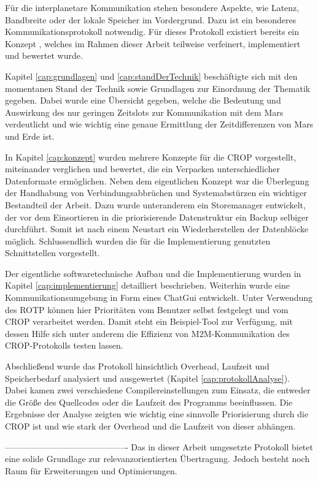 
Für die interplanetare Kommunikation stehen besondere Aspekte, wie Latenz,
Bandbreite oder der lokale Speicher im Vordergrund. Dazu ist ein besonderes
Kommunikationsprotokoll notwendig. Für dieses Protokoll existiert
bereits ein Konzept \cite{Daher}, welches im Rahmen dieser Arbeit
teilweise verfeinert, implementiert und bewertet wurde.

Kapitel \ref{cap:grundlagen} und \ref{cap:standDerTechnik} beschäftigte sich
mit den momentanen Stand der Technik sowie Grundlagen zur Einordnung der
Thematik gegeben. Dabei wurde eine Übersicht gegeben, welche die Bedeutung und
Auswirkung des nur geringen Zeitslots zur Kommunikation mit dem Mars
verdeutlicht und wie wichtig eine genaue Ermittlung der Zeitdifferenzen von Mars
und Erde ist.

In Kapitel \ref{cap:konzept} wurden mehrere Konzepte für die CROP vorgestellt,
miteinander verglichen und bewertet, die ein Verpacken unterschiedlicher
Datenformate ermöglichen. Neben dem eigentlichen Konzept war die Überlegung der
Handhabung von Verbindungsabbrüchen und Systemabstürzen ein wichtiger
Bestandteil der Arbeit. Dazu wurde unteranderem ein Storemanager entwickelt, der
vor dem Einsortieren in die priorisierende Datenstruktur ein Backup selbiger
durchführt. Somit ist nach einem Neustart ein Wiederherstellen der Datenblöcke
möglich. Schlussendlich wurden die für die Implementierung genutzten
Schnittstellen vorgestellt.

Der eigentliche softwaretechnische Aufbau und die Implementierung wurden in
Kapitel \ref{cap:implementierung} detailliert beschrieben. Weiterhin wurde eine
Kommunikationsumgebung in Form eines ChatGui entwickelt. Unter Verwendung des ROTP
können hier Prioritäten vom Benutzer selbst festgelegt und vom CROP verarbeitet
werden. Damit steht ein Beispiel-Tool zur Verfügung, mit dessen Hilfe sich
unter anderem die Effizienz von M$2$M-Kommunikation des CROP-Protokolls testen
lassen.

Abschließend wurde das Protokoll hinsichtlich Overhead, Laufzeit und
Speicherbedarf analysiert und ausgewertet (Kapitel \ref{cap:protokollAnalyse}).
Dabei kamen zwei verschiedene Compilereinstellungen zum Einsatz, die entweder
die Größe des Quellcodes oder die Laufzeit des Programms beeinflussen. Die
Ergebnisse der Analyse zeigten wie wichtig eine sinnvolle Priorisierung durch
die CROP ist und wie stark der Overhead und die Laufzeit von dieser abhängen.

------------------------------------------- \newline
Das in dieser Arbeit umgesetzte Protokoll bietet eine solide
Grundlage zur relevanzorientierten Übertragung. Jedoch besteht noch Raum
für Erweiterungen und Optimierungen.

